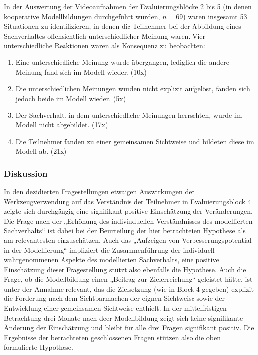 In der Auswertung der Videoaufnahmen der Evaluierungsblöcke 2 bis 5 (in denen kooperative Modellbildungen durchgeführt wurden, $n=69$) waren insgesamt 53 Situationen zu identifizieren, in denen die Teilnehmer bei der Abbildung eines Sachverhaltes offensichtlich unterschiedlicher Meinung waren. Vier unterschiedliche Reaktionen waren als Konsequenz zu beobachten:
\begin{enumerate}
	\item Eine unterschiedliche Meinung wurde übergangen, lediglich die andere Meinung fand sich im Modell wieder. (10x)
	\item Die unterschiedlichen Meinungen wurden nicht explizit aufgelöst, fanden sich jedoch beide im Modell wieder. (5x)
	\item Der Sachverhalt, in dem unterschiedliche Meinungen herrschten, wurde im Modell nicht abgebildet. (17x)
	\item Die Teilnehmer fanden zu einer gemeinsamen Sichtweise und bildeten diese im Modell ab. (21x)
\end{enumerate}
  
\subsubsection{Diskussion} 

In den dezidierten Fragestellungen etwaigen Auswirkungen der Werkzeugverwendung auf das Verständnis der Teilnehmer in Evaluierungsblock 4 zeigte sich durchgängig eine signifikant positive Einschätzung der Veränderungen. Die Frage nach der „Erhöhung des indiviuduellen Verständnisses des modellierten Sachverhalts“ ist dabei bei der Beurteilung der hier betrachteten Hypothese als am relevantesten einzuschätzen. Auch das „Aufzeigen von Verbesserungspotential in der Modellierung“ impliziert die Zusammenführung der individuell wahrgenommenen Aspekte des modellierten Sachverhalts, eine positive Einschätzung dieser Fragestellung stützt also ebenfalls die Hypothese. Auch die Frage, ob die Modellbildung einen „Beitrag zur Zielerreichung“ geleistet hätte, ist unter der Annahme relevant, das die Zielsetzung (wie in Block 4 gegeben) explizit die Forderung nach dem Sichtbarmachen der eignen Sichtweise sowie der Entwicklung einer gemeinsamen Sichtweise enthielt. In der mittelfristigen Betrachtung drei Monate nach deer Modellbildung zeigt sich keine signifikante Änderung der Einschätzung und bleibt für alle drei Fragen signifikant positiv. Die Ergebnisse der betrachteten geschlossenen Fragen stützen also die oben formulierte Hypothese.


